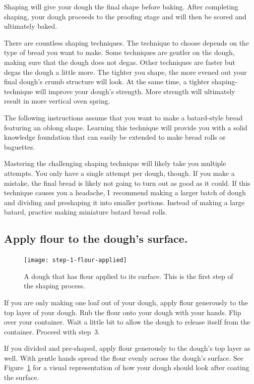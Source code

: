 Shaping will give your dough the final shape before baking. After
completing shaping, your dough proceeds to the proofing stage and
will then be scored and ultimately baked.

There are countless shaping techniques. The technique to choose
depends on the type of bread you want to make. Some techniques
are gentler on the dough, making sure that the dough does not
degas. Other techniques are faster but degas the dough a little
more. The tighter you shape, the more evened out your final dough's
crumb structure will look. At the same time, a tighter shaping-technique
will improve your dough's strength. More strength will ultimately result
in more vertical oven spring.

The following instructions assume that you want to make a batard-style
bread featuring an oblong shape. Learning this technique
will provide you with a solid knowledge foundation that
can easily be extended to make bread rolls or baguettes.

Mastering the challenging shaping technique will likely take you
multiple attempts. You only have a single attempt per dough, though. If you
make a mistake, the final bread is likely not going to turn out as good
as it could. If this technique causes you a headache, I~recommend making
a larger batch of dough and dividing and preshaping it into
smaller portions. Instead of making a large batard, practice making miniature
batard bread rolls.

\subsection[Flouring the surface]{Apply flour to the dough's surface.}

\begin{figure}[!htb]
  \texttt{[image: step-1-flour-applied]}
  \caption[Step 1 of shaping process]{A dough that has flour applied to its
      surface. This is the first step of the shaping process.}%
  \label{fig:shaping-flour-surface}
\end{figure}

If you are only making one loaf out of your dough, apply flour
generously to the top layer of your dough. Rub the flour onto your
dough with your hands. Flip over your container. Wait a little bit
to allow the dough to release itself from the container. Proceed
with step~3.

If you divided and pre-shaped, apply flour generously to the dough's
top layer as well. With gentle hands spread the flour evenly across
the dough's surface. See Figure~\ref{fig:shaping-flour-surface} for a
visual representation of how your dough should look after coating
the surface.

